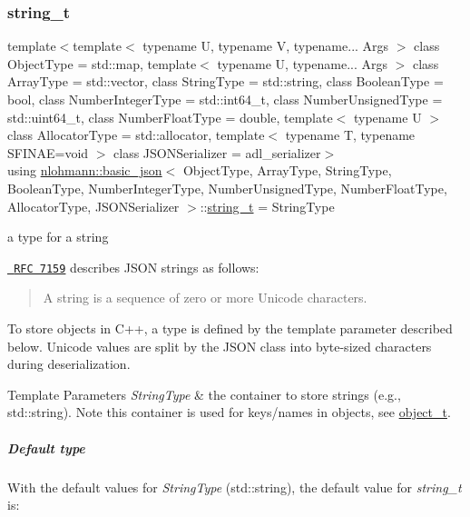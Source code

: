 \subsubsection{\texorpdfstring{string\_t}{string\_t}}
{\footnotesize\ttfamily template$<$template$<$ typename U, typename V, typename... Args $>$ class Object\+Type = std\+::map, template$<$ typename U, typename... Args $>$ class Array\+Type = std\+::vector, class String\+Type  = std\+::string, class Boolean\+Type  = bool, class Number\+Integer\+Type  = std\+::int64\+\_\+t, class Number\+Unsigned\+Type  = std\+::uint64\+\_\+t, class Number\+Float\+Type  = double, template$<$ typename U $>$ class Allocator\+Type = std\+::allocator, template$<$ typename T, typename S\+F\+I\+N\+A\+E=void $>$ class J\+S\+O\+N\+Serializer = adl\+\_\+serializer$>$ \\
using \mbox{\hyperlink{classnlohmann_1_1basic__json}{nlohmann\+::basic\+\_\+json}}$<$ Object\+Type, Array\+Type, String\+Type, Boolean\+Type, Number\+Integer\+Type, Number\+Unsigned\+Type, Number\+Float\+Type, Allocator\+Type, J\+S\+O\+N\+Serializer $>$\+::\mbox{\hyperlink{classnlohmann_1_1basic__json_a61f8566a1a85a424c7266fb531dca005}{string\+\_\+t}} =  String\+Type}



a type for a string 

\href{http://rfc7159.net/rfc7159}{\texttt{ R\+FC 7159}} describes J\+S\+ON strings as follows\+: \begin{quote}
A string is a sequence of zero or more Unicode characters. \end{quote}


To store objects in C++, a type is defined by the template parameter described below. Unicode values are split by the J\+S\+ON class into byte-\/sized characters during deserialization.


\begin{DoxyTemplParams}{Template Parameters}
{\em String\+Type} & the container to store strings (e.\+g., {\ttfamily std\+::string}). Note this container is used for keys/names in objects, see \mbox{\hyperlink{classnlohmann_1_1basic__json_aa1eb13d5aa86f80cbee6c58e90fbaf49}{object\+\_\+t}}.\\
\hline
\end{DoxyTemplParams}
\subparagraph*{Default type}

With the default values for {\itshape String\+Type} ({\ttfamily std\+::string}), the default value for {\itshape string\+\_\+t} is\+:


\begin{DoxyCode}{0}
\end{DoxyCode}


